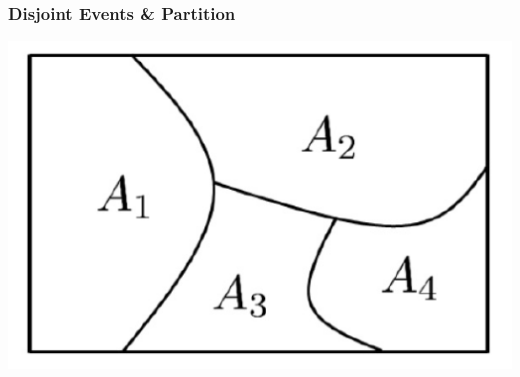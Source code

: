 \documentclass[compress]{beamer}
\begin{document}
\begin{frame}\frametitle{ Disjoint Events \& Partition}
\begin{center}
\vspace{-.7in}
\includegraphics[scale=.4]{figs/VDPartition_0.png} 
\end{center}
\end{frame}
\end{document}
